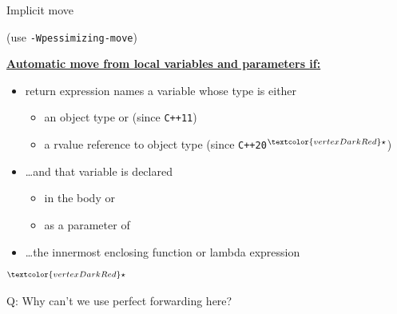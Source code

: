\begin{frame}{Implicit move}
    \begin{center}

        (use \texttt{-Wpessimizing-move})
    \end{center}

    \href{https://en.cppreference.com/w/cpp/language/return}{\textbf{Automatic move from local variables and parameters \underline{if}:}}
    \begin{itemize}
        \item return expression names a variable whose type is either
        \begin{itemize}
            \item an object type or (since \texttt{C++11})
            \item a rvalue reference to object type (since \texttt{C++20}${}^{\textcolor{vertexDarkRed}\star}$)
        \end{itemize}
        \item \ldots and that variable is declared
        \begin{itemize}
            \item in the body or
            \item as a parameter of
        \end{itemize}
        \item \ldots the innermost enclosing function or lambda expression
    \end{itemize}

    ${}^{\textcolor{vertexDarkRed}\star}$ 
\end{frame}

\begin{frame}[fragile]{Q: Why can't we use perfect forwarding here?}

\end{frame}

\begin{frame}
    \centering
    \scalebox{3}{Perfect Backwarding}
\end{frame}

